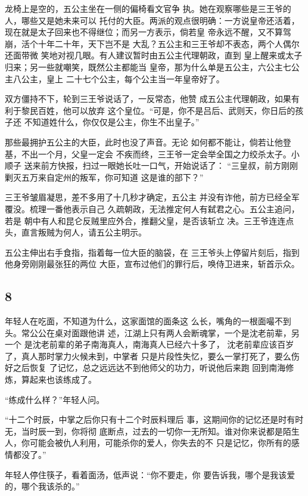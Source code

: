 龙椅上是空的，五公主坐在一侧的偏椅看文官争
执。她在观察哪些是三王爷的人，哪些又是她未来可以
托付的大臣。两派的观点很明确：一方说皇帝还活着，
现在就是太子回来也不得继位；而另一方表示，倘若皇
帝永远不醒，又不算驾崩，活个十年二十年，天下岂不是
大乱？五公主和三王爷却不表态，两个人偶尔还面带微
笑地对视几眼。有人建议暂时由五公主代理朝政，直到
皇上醒来或太子归来；另一些就嘲笑，既然公主都能当
皇帝，那为什么单是五公主，六公主七公主八公主，皇上
二十七个公主，每个公主当一年皇帝好了。

双方僵持不下，轮到三王爷说话了，一反常态，他赞
成五公主代理朝政，如果有利于黎民百姓，他可以放弃
这个皇位。“可是，你不是吕后、武则天，你日后的孩子还
不知道姓什么，你仅仅是公主，你生不出皇子。”

那些最拥护五公主的大臣，此时也没了声音。无论
如何都不能让，倘若让他登基，不出一个月，父皇一定会
不疾而终，三王爷一定会举全国之力绞杀太子。小顺子
送来前方快报，扫过一眼她长吐一口气，开始说话了：
“三皇叔，前方刚刚剿灭五万来自定州的叛军，你可知道
这是谁的部下？”

三王爷皱眉凝思，差不多用了十几秒才确定，五公主
并没有诈他，前方已经全军覆没。梳理一番他表示自己
久疏朝政，无法推定何人有弑君之心。五公主追问，若是
朝中有人和昆仑反贼里应外合，推翻父皇，是否该斩立
决。三王爷连连点头，直言叛贼为何人，请五公主明示。

五公主伸出右手食指，指着每一位大臣的脑袋，在
三王爷头上停留片刻后，指到他身旁刚刚最张狂的两位
大臣，宣布过他们的罪行后，唤侍卫进来，斩首示众。
\newline

{\centering\subsection{8}}

年轻人在吃面，不知道为什么，这家面馆的面条这
么长，嘴角的一根面嘬不到头。常公公在桌对面跟他讲
述，江湖上只有两人会断魂掌，一个是沈老前辈，另一个
是沈老前辈的弟子南海真人，南海真人已经六十多了，
沈老前辈应该百岁了，真人那时掌力火候未到，中掌者
只是片段性失忆，要么一掌打死了，要么伤好之后恢复
了记忆，总之远远达不到他师父的功力，听说他后来跑
回到南海修炼，算起来也该练成了。

“练成什么样？”年轻人问。

“十二个时辰，中掌之后你只有十二个时辰料理后
事，这期间你的记忆还是时有时无，当时辰一到，你将彻
底断点，过去的一切你一无所知。谁对你来说都是陌生
人，你可能会被仇人利用，可能杀你的爱人，你失去的不
只是记忆，你所有的感情都没了。”

年轻人停住筷子，看着面汤，低声说：“你不要走，你
要告诉我，哪个是我该爱的，哪个我该杀的。”

